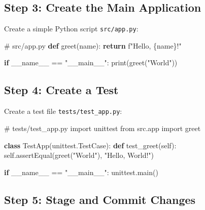 \documentclass[
  letterpaper,
  DIV=11,
  numbers=noendperiod]{scrreprt}
\newenvironment{Shaded}{\begin{snugshade}}{\end{snugshade}}
\newcommand{\BuiltInTok}[1]{\textcolor[rgb]{0.00,0.23,0.31}{#1}}
\newcommand{\CommentTok}[1]{\textcolor[rgb]{0.37,0.37,0.37}{#1}}
\newcommand{\ControlFlowTok}[1]{\textcolor[rgb]{0.00,0.23,0.31}{\textbf{#1}}}
\newcommand{\ImportTok}[1]{\textcolor[rgb]{0.00,0.46,0.62}{#1}}
\newcommand{\KeywordTok}[1]{\textcolor[rgb]{0.00,0.23,0.31}{\textbf{#1}}}
\newcommand{\NormalTok}[1]{\textcolor[rgb]{0.00,0.23,0.31}{#1}}
\newcommand{\OperatorTok}[1]{\textcolor[rgb]{0.37,0.37,0.37}{#1}}
\newcommand{\SpecialCharTok}[1]{\textcolor[rgb]{0.37,0.37,0.37}{#1}}
\newcommand{\SpecialStringTok}[1]{\textcolor[rgb]{0.13,0.47,0.30}{#1}}
\newcommand{\StringTok}[1]{\textcolor[rgb]{0.13,0.47,0.30}{#1}}
\newcommand{\VariableTok}[1]{\textcolor[rgb]{0.07,0.07,0.07}{#1}}
\begin{document}
\subsection{Step 3: Create the Main
Application}\label{step-3-create-the-main-application}

Create a simple Python script \texttt{src/app.py}:

\begin{Shaded}
\begin{Highlighting}[]
\CommentTok{\# src/app.py}
\KeywordTok{def}\NormalTok{ greet(name):}
    \ControlFlowTok{return} \SpecialStringTok{f"Hello, }\SpecialCharTok{\{}\NormalTok{name}\SpecialCharTok{\}}\SpecialStringTok{!"}

\ControlFlowTok{if} \VariableTok{\_\_name\_\_} \OperatorTok{==} \StringTok{"\_\_main\_\_"}\NormalTok{:}
    \BuiltInTok{print}\NormalTok{(greet(}\StringTok{"World"}\NormalTok{))}
\end{Highlighting}
\end{Shaded}

\subsection{Step 4: Create a Test}\label{step-4-create-a-test}

Create a test file \texttt{tests/test\_app.py}:

\begin{Shaded}
\begin{Highlighting}[]
\CommentTok{\# tests/test\_app.py}
\ImportTok{import}\NormalTok{ unittest}
\ImportTok{from}\NormalTok{ src.app }\ImportTok{import}\NormalTok{ greet}

\KeywordTok{class}\NormalTok{ TestApp(unittest.TestCase):}
    \KeywordTok{def}\NormalTok{ test\_greet(}\VariableTok{self}\NormalTok{):}
        \VariableTok{self}\NormalTok{.assertEqual(greet(}\StringTok{"World"}\NormalTok{), }\StringTok{"Hello, World!"}\NormalTok{)}

\ControlFlowTok{if} \VariableTok{\_\_name\_\_} \OperatorTok{==} \StringTok{"\_\_main\_\_"}\NormalTok{:}
\NormalTok{    unittest.main()}
\end{Highlighting}
\end{Shaded}

\subsection{Step 5: Stage and Commit
Changes}\label{step-5-stage-and-commit-changes}
\end{document}
